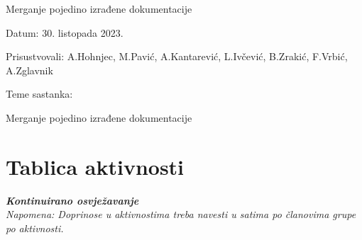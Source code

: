 \begin{packed_enum}
			\item  Merganje pojedino izrađene dokumentacije
			
			\item[] \begin{packed_item}
				\item Datum: 30. listopada 2023.
				\item Prisustvovali: A.Hohnjec, M.Pavić, A.Kantarević, L.Ivčević, B.Zrakić, F.Vrbić, A.Zglavnik
				\item Teme sastanka:
				\begin{packed_item}
					\item  Merganje pojedino izrađene dokumentacije
				\end{packed_item}
			\end{packed_item}
			
			
		\end{packed_enum}
		
		\eject
		\section*{Tablica aktivnosti}
		
			\textbf{\textit{Kontinuirano osvježavanje}}\\
			
			 \textit{Napomena: Doprinose u aktivnostima treba navesti u satima po članovima grupe po aktivnosti.}

